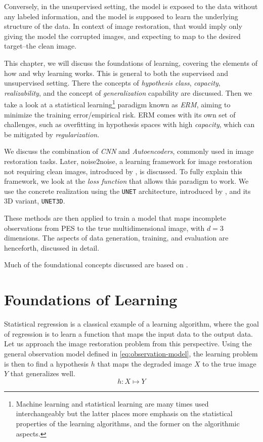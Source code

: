 Conversely, in the unsupervised setting, the model is exposed to the data without any labeled information, and the model is supposed to learn the underlying structure of the data. In context of image restoration, that would imply only giving the model the corrupted images, and expecting to map to the desired target--the clean image.

This chapter, we will discuss the foundations of learning, covering the elements of how and why learning works. This is general to both the supervised and unsupervised setting. There the concepts of \textit{hypothesis class}, \textit{capacity}, \textit{realizability}, and the concept of \textit{generalization} capability are discussed. Then we take a look at a statistical learning\footnote{Machine learning and statistical learning are many times used interchangeably but the latter places more emphasis on the statistical properties of the learning algorithms, and the former on the algorithmic aspects.} paradigm known as \textit{\gls{ERM}}, aiming to minimize the training error/empirical risk. \Gls{ERM} comes with its own set of challenges, such as overfitting in hypothesis spaces with high \textit{capacity}, which can be mitigated by \textit{regularization}. 

We discuss the combination of \textit{\gls{CNN}} and \textit{Autoencoders}, commonly used in image restoration tasks. Later, \gls{noise2noise}, a learning framework for image restoration not requiring clean images, introduced by \citeauthor{lehtinenNoise2NoiseLearningImage2018}, is discussed. To fully explain this framework, we look at the \textit{loss function} that allows this paradigm to work. We use the concrete realization using the \texttt{UNET} architecture, introduced by \citeauthor{ronnebergerUNetConvolutionalNetworks}, and its 3D variant, \texttt{UNET3D}.

These methods are then applied to train a model that maps incomplete observations from \gls{PES} to the true multidimensional image, with $d=3$ dimensions. The aspects of data generation, training, and evaluation are henceforth, discussed in detail.

Much of the foundational concepts discussed are based on \cite{shalev-shwartzUnderstandingMachineLearning2014a,jamesIntroductionStatisticalLearning2013,tibshiraniElementsStatisticalLearning,goodfellowDeepLearning2016}.

\section{Foundations of Learning}
Statistical regression is a classical example of a learning algorithm, where the goal of regression is to learn a function that maps the input data to the output data.
Let us approach the image restoration problem from this perspective. Using the general observation model defined in \cref{eq:observation-model}, the learning problem is then to find a hypothesis $h$ that maps the degraded image $X$ to the true image $Y$ that generalizes well.
\begin{equation}
    h: X \mapsto Y
\end{equation}

